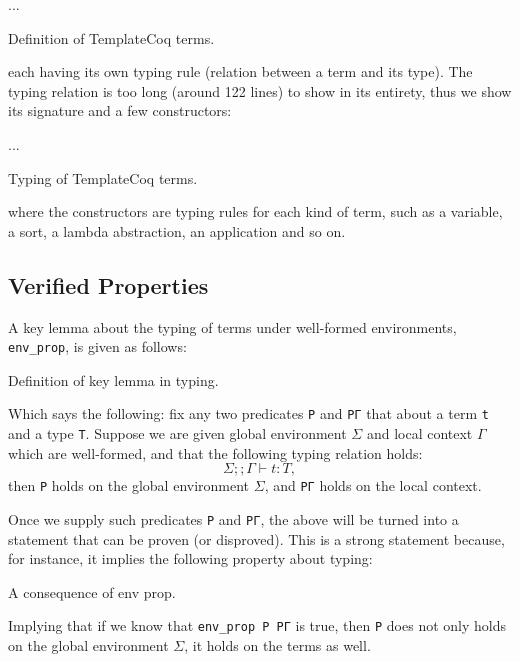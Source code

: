\begin{listing}[H]
  ...
  \caption{Definition of TemplateCoq terms.}
  \label{lst:1-term}
\end{listing}

each having its own typing rule (relation between a term and its type). The
typing relation is too long (around 122 lines) to show in its entirety, thus we
show its signature and a few constructors:

\begin{listing}[H]
  ...
  \caption{Typing of TemplateCoq terms.}
  \label{lst:1-typ-term}
\end{listing}

where the constructors are typing rules for each kind of term, such as a
variable, a sort, a lambda abstraction, an application and so on.

\subsection*{Verified Properties}

A key lemma about the typing of terms under well-formed environments,
\verb|env_prop|, is given as follows:

\begin{listing}[H]
  \caption{Definition of key lemma in typing.}
  \label{lst:1-def-env-prop}
\end{listing}

Which says the following: fix any two predicates \verb|P| and \verb|PΓ| that
about a term \verb|t| and a type \verb|T|. Suppose we are given global
environment $\Sigma$ and local context $\Gamma$ which are well-formed, and that
the following typing relation holds:
\[\Sigma ;; \Gamma \vdash t:T,\]
then \verb|P| holds on the global environment $\Sigma$, and \verb|PΓ| holds on
the local context.

Once we supply such predicates \verb|P| and \verb|PΓ|, the above will be turned
into a statement that can be proven (or disproved). This is a strong statement
because, for instance, it implies the following property about typing:

\begin{listing}[H]
  \caption{A consequence of env prop.}
  \label{lst:1-def-env-prop-typing}
\end{listing}

Implying that if we know that \verb|env_prop P PΓ| is true, then \verb|P| does
not only holds on the global environment $\Sigma$, it holds on the terms as
well.

